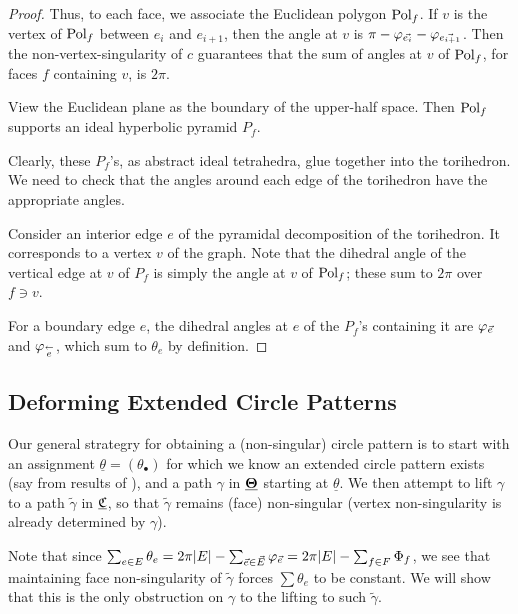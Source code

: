\begin{proof}
Thus, to each face, we associate the Euclidean polygon ${\text{Pol}}_f$.
If $v$ is the vertex of ${\text{Pol}}_f$ between $e_i$ and $e_{i+1}$,
then the angle at $v$ is
$\pi - \varphi_{\vec{e_i}} - \varphi_{\vec{e_{i+1}}}$.
Then the non-vertex-singularity of $c$ guarantees that
the sum of angles at $v$ of ${\text{Pol}}_f$, for faces $f$ containing $v$,
is $2\pi$.


View the Euclidean plane as the boundary of the upper-half space.
Then ${\text{Pol}}_f$ supports an ideal hyperbolic pyramid $P_f$.

Clearly, these $P_f$'s, as abstract ideal tetrahedra,
glue together into the torihedron.
We need to check that the angles around each edge of
the torihedron have the appropriate angles.


Consider an interior edge $e$ of the pyramidal decomposition
of the torihedron.
It corresponds to a vertex $v$ of the graph.
Note that the dihedral angle of the vertical edge
at $v$ of $P_f$ is simply the angle at $v$ of ${\text{Pol}}_f$;
these sum to $2\pi$ over $f \ni v$.


For a boundary edge $e$, the dihedral angles at $e$ of the $P_f$'s
containing it are $\varphi_{\vec{e}}$ and $\varphi_{\overset{\leftarrow}{e}}$,
which sum to $\theta_e$ by definition.

\end{proof}


\subsection{Deforming Extended Circle Patterns}



Our general strategry for obtaining a (non-singular) circle pattern
is to start with an assignment $\underline{\theta} = (\theta_\bullet)$
for which we know an extended circle pattern exists
(say from results of \cite{BandS}),
and a path $\gamma$ in ${\underline{\mathbf{\Theta}}}$ starting at $\underline{\theta}$.
We then attempt to lift $\gamma$ to a path $\tilde{\gamma}$ in ${\underline{\mathfrak{C}}}$,
so that $\tilde{\gamma}$ remains (face) non-singular
(vertex non-singularity is already determined by $\gamma$).

Note that since $\sum_{e\in E} \theta_e
= 2\pi |E| - \sum_{\vec{e} \in \vec{E}} \varphi_{\vec{e}}
= 2\pi |E| - \sum_{f\in F} \Phi_f$,
we see that maintaining face non-singularity of $\tilde{\gamma}$
forces $\sum \theta_e$ to be constant.
We will show that this is the only obstruction on $\gamma$
to the lifting to such $\tilde{\gamma}$.

